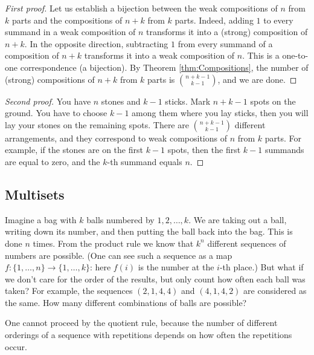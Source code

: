 \begin{page}

\begin{proof}[First proof]
Let us establish a bijection between the weak compositions of $n$ from $k$ parts and the compositions of $n+k$ from $k$ parts.
Indeed, adding $1$ to every summand in a weak composition of $n$ transforms it into a (strong) composition of $n+k$.
In the opposite direction, subtracting $1$ from every summand of a composition of $n+k$ transforms it into
a weak composition of $n$.
This is a one-to-one correspondence (a bijection).
By Theorem \ref{thm:Compositions}, the number of (strong) compositions of $n+k$ from $k$ parts is $\binom{n+k-1}{k-1}$, and we are done.
\end{proof}

\begin{proof}[Second proof]
You have $n$ stones and $k-1$ sticks.
Mark $n+k-1$ spots on the ground.
You have to choose $k-1$ among them where you lay sticks, then you will lay your stones on the remaining spots.
There are $\binom{n+k-1}{k-1}$ different arrangements, and they correspond to weak compositions of $n$ from $k$ parts.
For example, if the stones are on the first $k-1$ spots, then the first $k-1$ summands are equal to zero, and the $k$-th summand equals $n$.
\end{proof}



\end{page}

\begin{page}

\subsection{Multisets}
Imagine a bag with $k$ balls numbered by $1, 2, \ldots, k$.
We are taking out a ball, writing down its number, and then putting the ball back into the bag.
This is done $n$ times.
From the product rule we know that $k^n$ different sequences of numbers are possible.
(One can see such a sequence as a map $f \colon \{1, \ldots, n\} \to \{1, \ldots, k\}$: here $f(i)$ is the number at the $i$-th place.)
But what if we don't care for the order of the results, but only count how often each ball was taken?
For example, the sequences $(2, 1, 4, 4)$ and $(4, 1, 4, 2)$ are considered as the same.
How many different combinations of balls are possible?

One cannot proceed by the quotient rule, because the number of different orderings of a sequence with repetitions depends on how often the repetitions occur.


\end{page}

